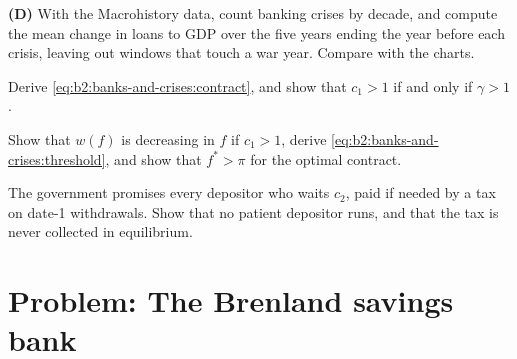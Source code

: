 \begin{exercise}[$\star\star$]\label{exo:b2:banks-and-crises:9}
\textbf{(D)} With the Macrohistory data, count banking crises by decade, and compute the mean change in loans to GDP over the
five years ending the year before each crisis, leaving out windows that touch a war year. Compare with the charts.
\end{exercise}

\begin{exercise}[$\star\star\star$]\label{exo:b2:banks-and-crises:10}
Derive \eqref{eq:b2:banks-and-crises:contract}, and show that $c_1 > 1$ if and only if $\gamma > 1$.
\end{exercise}

\begin{exercise}[$\star\star\star$]\label{exo:b2:banks-and-crises:11}
Show that $w(f)$ is decreasing in $f$ if $c_1 > 1$, derive \eqref{eq:b2:banks-and-crises:threshold}, and show that
$f^* > \pi$ for the optimal contract.
\end{exercise}

\begin{exercise}[$\star\star\star$]\label{exo:b2:banks-and-crises:12}
The government promises every depositor who waits $c_2$, paid if needed by a tax on date-1 withdrawals. Show that no patient
depositor runs, and that the tax is never collected in equilibrium.
\end{exercise}

\section{Problem: The Brenland savings bank}\label{sec:b2:banks-and-crises:problem}

